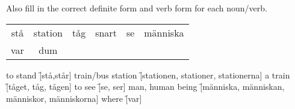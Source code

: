 \begin{flushleft}
    Also fill in the correct definite form and verb form for each noun/verb.
\end{flushleft}
\begin{center}
    \begin{tabular}{|c c c c c c|}
        \hline
        stå & station & tåg & snart & se & människa \\
        var & dum &&&& \\
        \hline
    \end{tabular}
\end{center}

\begin{questions}
    \begin{multicols}{3}
        \raggedcolumns
        \question to stand \f[stå,står]
        \question train/bus station \f[stationen, stationer, stationerna]
        \question a train \f[tåget, tåg, tågen]
        \question to see \f[se, ser]
        \question man, human being \f[människa, människan, människor, människorna]
        \question where \f[var]
    \end{multicols}
\end{questions}

